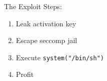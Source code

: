 \documentclass[usenames,dvipsnames]{beamer}
\begin{document}
    \begin{frame}{The Exploit}
        Steps:
        \begin{enumerate}
            \item Leak activation key
            \item Escape seccomp jail
            \item Execute \lstinline{system("/bin/sh")}
            \item Profit
        \end{enumerate}
    \end{frame}
\end{document}

